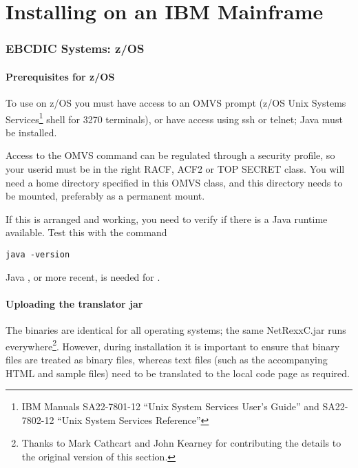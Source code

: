 \chapter{Installing on an IBM Mainframe}
\subsection{EBCDIC Systems: z/OS}

\subsubsection{Prerequisites for z/OS}
To use \nr{} on z/OS you must have access to an OMVS
prompt (z/OS Unix Systems Services\footnote{IBM Manuals SA22-7801-12 ``Unix System
  Services User's Guide''
  and  SA22-7802-12 ``Unix System Services Reference''}  shell for
3270 terminals), or have access using ssh or telnet; Java must be
installed.

Access to the OMVS command can be regulated through a security profile, so your userid
must be in the right RACF, ACF2 or TOP SECRET class. You will need a home
directory specified in this OMVS class, and this directory needs to be
mounted, preferably as a permanent mount.

If this is arranged and working, you need to verify if there is a Java
runtime available. Test this with the command 
\begin{lstlisting}
java -version
\end{lstlisting}
Java \minimalJVMversion{}, or more recent, is needed for \nr{}.

\subsubsection{Uploading the \nr{} translator jar}

The \nr{} binaries are identical for all operating systems; the same
NetRexxC.jar runs everywhere\footnote{Thanks to Mark Cathcart
  and John Kearney for contributing the details to the original version of this section.}.
However, during installation it is important to ensure that binary files
are treated as binary files, whereas text files (such as the
accompanying HTML and sample files) need to be translated to the local code
page as required. 

